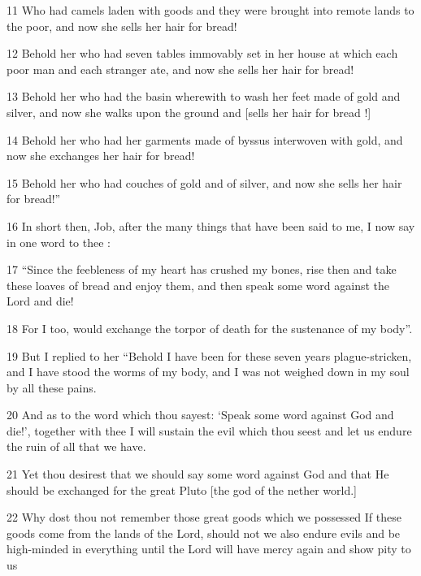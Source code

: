 \par 11 Who had camels laden with goods and they were brought into remote lands to the poor, and now she sells her hair for bread!

\par 12 Behold her who had seven tables immovably set in her house at which each poor man and each stranger ate, and now she sells her hair for bread!

\par 13 Behold her who had the basin wherewith to wash her feet made of gold and silver, and now she walks upon the ground and [sells her hair for bread !]

\par 14 Behold her who had her garments made of byssus interwoven with gold, and now she exchanges her hair for bread!

\par 15 Behold her who had couches of gold and of silver, and now she sells her hair for bread!”

\par 16 In short then, Job, after the many things that have been said to me, I now say in one word to thee :

\par 17 “Since the feebleness of my heart has crushed my bones, rise then and take these loaves of bread and enjoy them, and then speak some word against the Lord and die!

\par 18 For I too, would exchange the torpor of death for the sustenance of my body”. 

\par 19 But I replied to her “Behold I have been for these seven years plague-stricken, and I have stood the worms of my body, and I was not weighed down in my soul by all these pains.

\par 20 And as to the word which thou sayest: ‘Speak some word against God and die!’, together with thee I will sustain the evil which thou seest and let us endure the ruin of all that we have.

\par 21 Yet thou desirest that we should say some word against God and that He should be exchanged for the great Pluto [the god of the nether world.]

\par 22 Why dost thou not remember those great goods which we possessed If these goods come from the lands of the Lord, should not we also endure evils and be high-minded in everything until the Lord will have mercy again and show pity to us


